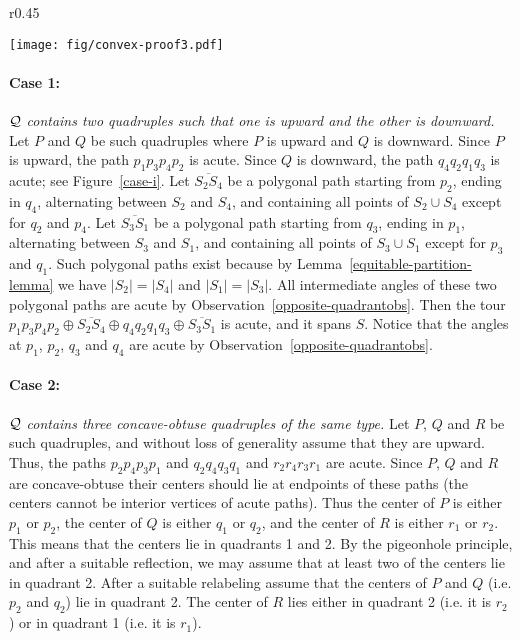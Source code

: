 \documentclass[11pt,letter]{article}
\begin{document}
\begin{wrapfigure}{r}{0.45\textwidth}
	\begin{center}
		\vspace{-22pt}
		\texttt{[image: fig/convex-proof3.pdf]}
	\end{center}
\vspace{-15pt}
\caption{Illustration of Case 1.}
\label{case-i}
	\vspace{-5pt}
\end{wrapfigure}
\paragraph{Case 1:} $\cal Q$ {\em contains two quadruples such that one is upward and the other is downward.} Let $P$ and $Q$ be such quadruples where $P$ is upward and $Q$ is downward. Since $P$ is upward, the path  $p_1p_3p_4p_2$ is acute. Since $Q$ is downward, the path $q_4q_2q_1q_3$ is acute; see Figure~\ref{case-i}. 
Let $\overline{S_2S_4}$ be a polygonal path starting from $p_2$, ending in $q_4$, alternating between $S_2$ and $S_4$, and containing all points of $S_2\cup S_4$ except for $q_2$ and $p_4$.
Let $\overline{S_3S_1}$ be a polygonal path starting from $q_3$, ending in $p_1$, alternating between $S_3$ and $S_1$, and containing all points of $S_3\cup S_1$ except for $p_3$ and $q_1$. Such polygonal paths exist because by Lemma~\ref{equitable-partition-lemma} we have $|S_2|=|S_4|$ and $|S_1|=|S_3|$. All intermediate angles of these two polygonal paths are acute by Observation~\ref{opposite-quadrantobs}. Then the tour $p_1p_3p_4p_2\oplus\overline{S_2S_4}\oplus q_4q_2q_1q_3\oplus\overline{S_3S_1}$ is acute, and it spans $S$. Notice that the angles at $p_1$, $p_2$, $q_3$ and $q_4$ are acute by Observation~\ref{opposite-quadrantobs}. 


\paragraph{Case 2:}$\cal Q$ {\em contains three concave-obtuse quadruples of the same type.} Let $P$, $Q$ and $R$ be such quadruples, and without loss of generality assume that they are upward. Thus, the paths $p_2p_4p_3p_1$ and $q_2q_4q_3q_1$ and $r_2r_4r_3r_1$ are acute. Since $P$, $Q$ and $R$ are concave-obtuse their centers should lie at endpoints of these paths (the centers cannot be interior vertices of acute paths). Thus the center of $P$ is either $p_1$ or $p_2$, the center of $Q$ is either $q_1$ or $q_2$, and the center of $R$ is either $r_1$ or $r_2$. This means that the centers lie in quadrants 1 and 2. By the pigeonhole principle, and after a suitable reflection, we may assume that at least two of the centers lie in quadrant 2. After a suitable relabeling assume that the centers of $P$ and $Q$ (i.e. $p_2$ and $q_2$) lie in quadrant 2. The center of $R$ lies either in quadrant 2 (i.e. it is $r_2$) or in quadrant 1 (i.e. it is $r_1$).
\end{document}
